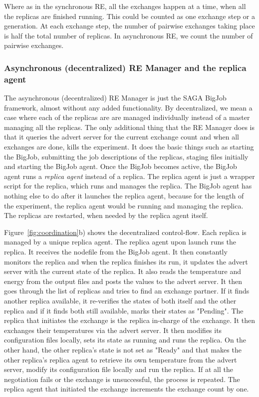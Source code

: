 \documentclass{rspublic}
\begin{document}
Where as in the synchronous RE, all the exchanges happen at a time, when all the replicas are finished running. This could be counted as one exchange step or a generation. At each exchange step, the number of pairwise exchanges taking place is half the total number of replicas. In asynchronous RE, we count the number of pairwise exchanges. 

\subsubsection{Asynchronous (decentralized) RE Manager and the replica agent}

The asynchronous (decentralized) RE Manager is just the SAGA BigJob framework, almost without any added functionality. By decentralized, we mean a case where each of the replicas are are managed individually instead of a master managing all the replicas. The only additional thing that the RE Manager does is that it queries the advert server for the current exchange count and when all exchanges are done, kills the experiment. It does the basic things such as starting the BigJob, submitting the job descriptions of the replicas, staging files initially and starting the BigJob agent. Once the BigJob becomes active, the BigJob agent runs a \emph{replica agent} instead of a replica. The replica agent is just a wrapper script for the replica, which runs and manages the replica. The BigJob agent has nothing else to do after it launches the replica agent, because for the length of the experiment, the replica agent would be running and managing the replica. The replicas are restarted, when needed by the replica agent itself. 

Figure~\ref{fig:coordination}b) shows the decentralized control-flow. Each replica is managed by a unique replica agent. The replica agent upon launch runs the replica. It receives the nodefile from the BigJob agent. It then constantly monitors the replica and when the replica finishes its run, it updates the advert server with the current state of the replica. It also reads the temperature and energy from the output files and posts the values to the advert server. It then goes through the list of replicas and tries to find an exchange partner. If it finds another replica available, it re-verifies the states of both itself and the other replica and if it finds both still available, marks their states as "Pending". The replica that initiates the exchange is the replica in-charge of the exchange. It then exchanges their temperatures via the advert server. It then modifies its configuration files locally, sets its state as running and runs the replica. On the other hand, the other replica's state is not set as "Ready" and that makes the other replica's replica agent to retrieve its own temperature from the advert server, modify its configuration file locally and run the replica. If at all the negotiation fails or the exchange is unsuccessful, the process is repeated. The replica agent that initiated the exchange increments the exchange count by one. 
\end{document}

